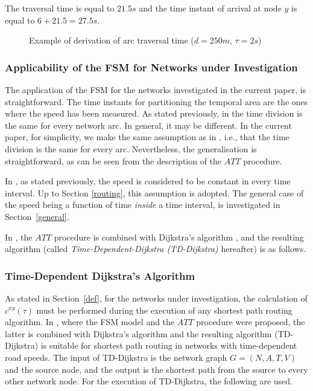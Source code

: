 \documentclass[conference]{IEEEtran}
\begin{document}
The traversal time is equal to $21.5s$ and the time instant of arrival at node $y$ is equal to $6+21.5=27.5s$.

\begin{figure}
\caption{Example of derivation of arc traversal time ($d=250m$, $\tau=2s$)} \label{example}
\end{figure}

\subsubsection{Applicability of the FSM for Networks under Investigation}

The application of the FSM for the networks investigated in the current paper, is straightforward. The time instants for partitioning the temporal area are the ones where the speed has been measured. As stated previously, in \cite{Sung} the time division is the same for every network arc. In general, it may be different. In the current paper, for simplicity, we make the same assumption as in \cite{Sung}, i.e., that the time division is the same for every arc. Nevertheless, the generalisation is straightforward, as can be seen from the description of the $ATT$ procedure. 

In \cite{Sung}, as stated previously, the speed is considered to be constant in every time interval. Up to Section \ref{routing}, this assumption is adopted. The general case of the speed being a function of time \emph{inside} a time interval, is investigated in Section~\ref{general}. 

In \cite{Sung}, the $ATT$ procedure is combined with Dijkstra's algorithm \cite{dijkstra}, and the resulting algorithm  (called \emph{Time-Dependent-Dijkstra (TD-Dijkstra)} hereafter) is as follows.  


\subsubsection{Time-Dependent Dijkstra's Algorithm}

As stated in Section~\ref{def}, for the networks under investigation, the calculation of $c^{xy}(\tau)$ must be performed during the execution of any shortest path routing algorithm. In \cite{Sung}, where the FSM model and the $ATT$ procedure were proposed, the latter is combined with Dijkstra's algorithm \cite{dijkstra} and the resulting algorithm (TD-Dijkstra) is suitable for shortest path routing in networks with time-dependent road speeds. The input of TD-Dijkstra is the network graph $G=(N, A, T, V)$ and the source node, and the output is the shortest path from the source to every other network node. For the execution of TD-Dijkstra, the following are used.
\end{document}
